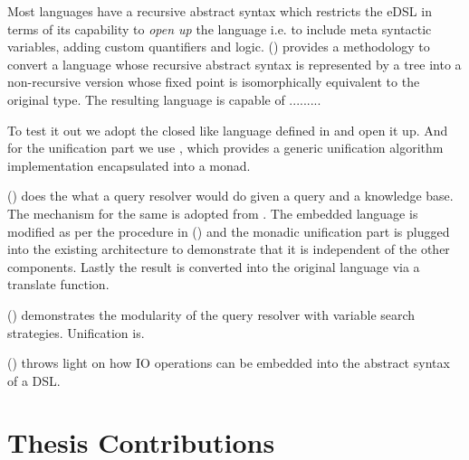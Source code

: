 \documentclass[thesis-solanki.tex]{subfiles}
\begin{document}
Most languages have a recursive abstract syntax which restricts the eDSL in terms of its capability to \textit{open up} the language i.e. to
include meta syntactic variables, adding custom quantifiers and logic. () provides a 
methodology to convert a language whose recursive abstract syntax is represented by a tree into a non-recursive version whose 
fixed point is isomorphically equivalent to the original type. The resulting language is capable of .........  

To test it out we adopt the closed  like language defined in \cite{prolog-lib} and open it up. And for 
the unification part we use \cite{unification-fd-lib}, which provides a generic unification algorithm implementation encapsulated into a 
monad. 

() does the what a  query resolver would do given a query and a knowledge base. 
The mechanism for the same is adopted from \cite{prolog-lib}. The embedded language is modified as per the procedure in 
() and the monadic unification part is plugged into the existing architecture to demonstrate that it 
is independent of the other components. Lastly the result is converted into the original language via a translate function.

() demonstrates the modularity of the query resolver with variable search strategies. Unification 
is. 

() throws light on how IO operations can be embedded into the abstract syntax of a DSL.  




\section{Thesis Contributions}
\end{document}
